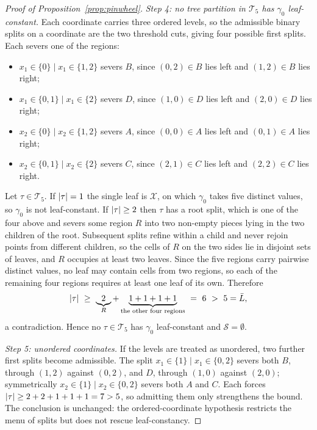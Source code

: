 \documentclass[11pt]{article}
\theoremstyle{plain}
\theoremstyle{definition}
\theoremstyle{remark}
\newcommand{\cX}{\mathcal{X}}
\newcommand{\cT}{\mathcal{T}}
\newcommand{\cS}{\mathcal{S}}
\DeclarePairedDelimiter{\card}{\lvert}{\rvert}
\begin{document}
\begin{proof}[Proof of Proposition~\ref{prop:pinwheel}]
\emph{Step 4: no tree partition in $\cT_5$ has $\gamma_0$ leaf-constant.} Each
coordinate carries three ordered levels, so the admissible binary splits on a
coordinate are the two threshold cuts, giving four possible first splits. Each
severs one of the regions:
\begin{itemize}[nosep,leftmargin=*]
  \item $x_1\in\{0\}\mid x_1\in\{1,2\}$ severs $B$, since $(0,2)\in B$ lies left
  and $(1,2)\in B$ lies right;
  \item $x_1\in\{0,1\}\mid x_1\in\{2\}$ severs $D$, since $(1,0)\in D$ lies left
  and $(2,0)\in D$ lies right;
  \item $x_2\in\{0\}\mid x_2\in\{1,2\}$ severs $A$, since $(0,0)\in A$ lies left
  and $(0,1)\in A$ lies right;
  \item $x_2\in\{0,1\}\mid x_2\in\{2\}$ severs $C$, since $(2,1)\in C$ lies left
  and $(2,2)\in C$ lies right.
\end{itemize}
Let $\tau\in\cT_5$. If $\card\tau=1$ the single leaf is $\cX$, on which $\gamma_0$
takes five distinct values, so $\gamma_0$ is not leaf-constant. If
$\card\tau\ge2$ then $\tau$ has a root split, which is one of the four above and
severs some region $R$ into two non-empty pieces lying in the two children of the
root. Subsequent splits refine within a child and never rejoin points from
different children, so the cells of $R$ on the two sides lie in disjoint sets of
leaves, and $R$ occupies at least two leaves. Since the five regions carry
pairwise distinct values, no leaf may contain cells from two regions, so each of
the remaining four regions requires at least one leaf of its own. Therefore
\[
  \card\tau\ \ge\ \underbrace{2}_{R}
  +\underbrace{1+1+1+1}_{\text{the other four regions}}\ =\ 6\ >\ 5=\bar L,
\]
a contradiction. Hence no $\tau\in\cT_5$ has $\gamma_0$ leaf-constant and
$\cS=\emptyset$.

\emph{Step 5: unordered coordinates.} If the levels are treated as unordered, two
further first splits become admissible. The split
$x_1\in\{1\}\mid x_1\in\{0,2\}$ severs both $B$, through $(1,2)$ against
$(0,2)$, and $D$, through $(1,0)$ against $(2,0)$; symmetrically
$x_2\in\{1\}\mid x_2\in\{0,2\}$ severs both $A$ and $C$. Each forces
$\card\tau\ge2+2+1+1+1=7>5$, so admitting them only strengthens the bound. The
conclusion is unchanged: the ordered-coordinate hypothesis restricts the menu of
splits but does not rescue leaf-constancy.
\end{proof}
\end{document}
